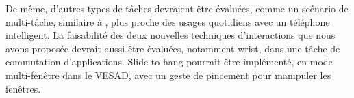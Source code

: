 
De même, d'autres types de tâches devraient être évaluées, comme un scénario de multi-tâche, similaire à \cite{Ens2014}, plus proche des usages quotidiens avec un téléphone intelligent. La faisabilité des deux nouvelles techniques d'interactions que nous avons proposée devrait aussi être évaluées, notamment wrist, dans une tâche de commutation d'applications. Slide-to-hang pourrait être implémenté, en mode multi-fenêtre dans le VESAD, avec un geste de pincement  pour manipuler les fenêtres.

